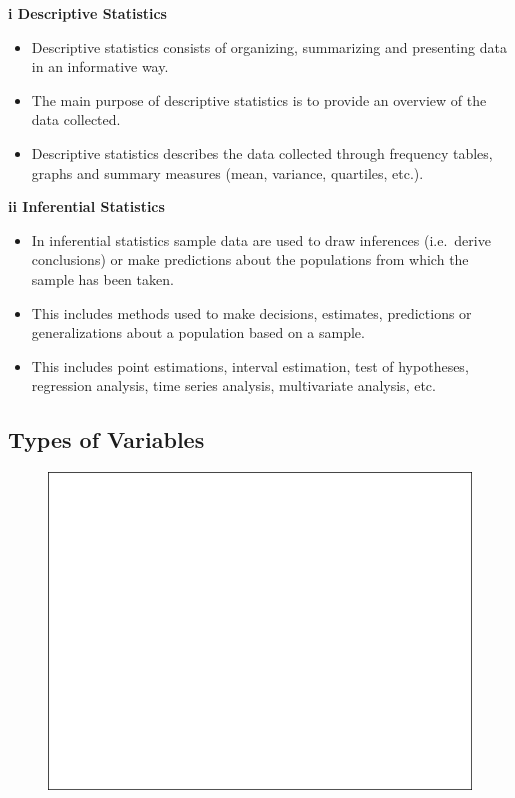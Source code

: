 \documentclass[]{book}
\providecommand{\tightlist}{%
  \setlength{\itemsep}{0pt}\setlength{\parskip}{0pt}}
\begin{document}
\textbf{i Descriptive Statistics}

\begin{itemize}
\tightlist
\item
  Descriptive statistics consists of organizing, summarizing and presenting data in an informative way.
\item
  The main purpose of descriptive statistics is to provide an overview of the data collected.
\item
  Descriptive statistics describes the data collected through frequency tables, graphs and summary measures (mean, variance, quartiles, etc.).
\end{itemize}

\textbf{ii Inferential Statistics}

\begin{itemize}
\tightlist
\item
  In inferential statistics sample data are used to draw inferences (i.e.~derive conclusions) or make predictions about the populations from which the sample has been taken.
\item
  This includes methods used to make decisions, estimates, predictions or generalizations about a population based on a sample.
\item
  This includes point estimations, interval estimation, test of hypotheses, regression analysis, time series analysis, multivariate analysis, etc.
\end{itemize}

\hypertarget{types-of-variables}{%
\subsection{Types of Variables}\label{types-of-variables}}

\begin{figure}

{\centering \includegraphics[width=1\linewidth]{figure/box2-1} 

}

\end{figure}
\end{document}
